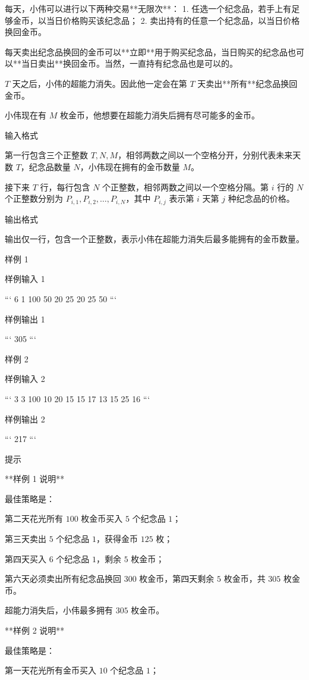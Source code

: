 \documentclass[12pt,twiside,a4paper]{ctexbook}
\numberwithin{chapter}{part}
\begin{document}
每天，小伟可以进行以下两种交易**无限次**：
1. 任选一个纪念品，若手上有足够金币，以当日价格购买该纪念品；
2. 卖出持有的任意一个纪念品，以当日价格换回金币。

每天卖出纪念品换回的金币可以**立即**用于购买纪念品，当日购买的纪念品也可以**当日卖出**换回金币。当然，一直持有纪念品也是可以的。

$T$ 天之后，小伟的超能力消失。因此他一定会在第 $T$ 天卖出**所有**纪念品换回金币。

小伟现在有 $M$ 枚金币，他想要在超能力消失后拥有尽可能多的金币。

 输入格式

第一行包含三个正整数 $T, N, M$，相邻两数之间以一个空格分开，分别代表未来天数 $T$，纪念品数量 $N$，小伟现在拥有的金币数量 $M$。

接下来 $T$ 行，每行包含 $N$ 个正整数，相邻两数之间以一个空格分隔。第 $i$ 行的 $N$ 个正整数分别为 $P_{i,1},P_{i,2},\dots,P_{i,N}$，其中 $P_{i,j}$ 表示第 $i$ 天第 $j$ 种纪念品的价格。

 输出格式

输出仅一行，包含一个正整数，表示小伟在超能力消失后最多能拥有的金币数量。

 样例 1

 样例输入 1

```
6 1 100
50
20
25
20
25
50
```

 样例输出 1

```
305
```

 样例 2

 样例输入 2

```
3 3 100
10 20 15
15 17 13
15 25 16
```

 样例输出 2

```
217
```

 提示

**样例 1 说明**

最佳策略是：

第二天花光所有 $100$ 枚金币买入 $5$ 个纪念品 $1$；

第三天卖出 $5$ 个纪念品 $1$，获得金币 $125$ 枚；

第四天买入 $6$ 个纪念品 $1$，剩余 $5$ 枚金币；

第六天必须卖出所有纪念品换回 $300$ 枚金币，第四天剩余 $5$ 枚金币，共 $305$ 枚金币。

超能力消失后，小伟最多拥有 $305$ 枚金币。

**样例 2 说明**

最佳策略是：

第一天花光所有金币买入 $10$ 个纪念品 $1$；
\end{document}
